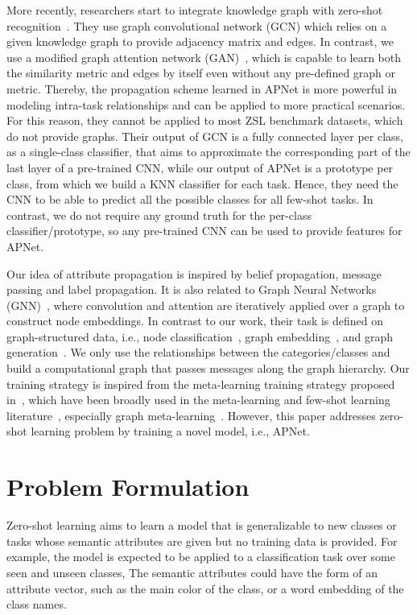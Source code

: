\documentclass[letterpaper]{article}
\begin{document}
More recently, researchers start to integrate knowledge graph with zero-shot recognition~\cite{wang2018zero,kampffmeyer2019rethinking}.
They use graph convolutional network (GCN) which relies on a given knowledge graph to provide adjacency matrix and edges. In contrast, we use a modified graph attention network (GAN)~\cite{DBLP:conf/aaai/ShenZLJPZ18,DBLP:conf/naacl/ShenZL0Z19},  which is capable to learn both the similarity metric and edges by itself even without any pre-defined graph or metric.
Thereby, the propagation scheme learned in APNet is more powerful in modeling intra-task relationships and can be applied to more practical scenarios. For this reason, they cannot be applied to most ZSL benchmark datasets, which do not provide graphs.
Their output of GCN is a fully connected layer per class, as a single-class classifier, that aims to approximate the corresponding part of the last layer of a pre-trained CNN, while our output of APNet is a prototype per class, from which we build a KNN classifier for each task. Hence, they need the CNN to be able to predict all the possible classes for all few-shot tasks. In contrast, we do not require any ground truth for the per-class classifier/prototype, so any pre-trained CNN can be used to provide features for APNet.






Our idea of attribute propagation is inspired by belief propagation, message passing and label propagation.
It is also related to Graph Neural Networks (GNN)~\cite{henaff2015deep,wu2019comprehensive}, where convolution and attention are iteratively applied over a graph to construct node embeddings.
In contrast to our work, their task is defined on graph-structured data, i.e., node classification~\cite{hamilton2017inductive}, graph embedding~\cite{pan2018adversarially}, and graph generation~\cite{dai2018syntax}. We only use the relationships between the categories/classes and build a computational graph that passes messages along the graph hierarchy. Our training strategy is inspired from the meta-learning training strategy proposed in~\cite{santoro2016meta}, which have been broadly used in the meta-learning and few-shot learning literature~\cite{finn2017model,snell2017prototypical,dong2019search}, especially graph meta-learning~\cite{liu2019ppn,liu2019GPN}. However, this paper addresses zero-shot learning problem by training a novel model, i.e.,  APNet.


\section{Problem Formulation}
Zero-shot learning aims to learn a model that is generalizable to new classes or tasks whose semantic attributes are given but no training data is provided. For example, the model is expected to be applied to a classification task over some seen and unseen classes,
The semantic attributes could have the form of an attribute vector, such as the main color of the class, or a word embedding  of the class names.
\end{document}
